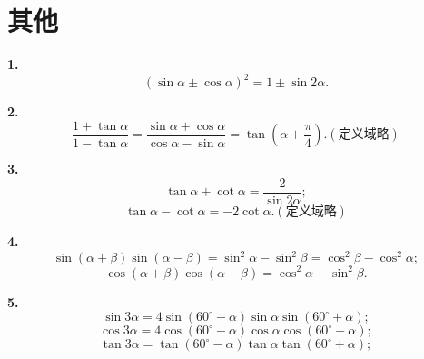 \documentclass{article}
\begin{document}
\section{{\large 其他}}
\textbf{1.}\[(\sin\alpha\pm\cos\alpha)^2=1\pm\sin2\alpha.\]
\par\textbf{2.}
\[\frac{1+\tan\alpha}{1-\tan\alpha}=\frac{\sin\alpha+\cos\alpha}{\cos\alpha-\sin\alpha}=\tan\left(\alpha+\frac{\pi}{4}\right).(\text{定义域略})\]
\par\textbf{3.}
\[\tan\alpha+\cot\alpha=\frac{2}{\sin2\alpha};\]
\[\tan\alpha-\cot\alpha=-2\cot\alpha.(\text{定义域略})\]
\par\textbf{4.}
\[\sin(\alpha+\beta)\sin(\alpha-\beta)=\sin^2\alpha-\sin^2\beta=\cos^2\beta-\cos^2\alpha;\]
\[\cos(\alpha+\beta)\cos(\alpha-\beta)=\cos^2\alpha-\sin^2\beta.\]
\par\textbf{5.}
\[\sin3\alpha=4\sin(60^\circ-\alpha)\sin\alpha\sin(60^\circ+\alpha);\]
\[\cos3\alpha=4\cos(60^\circ-\alpha)\cos\alpha\cos(60^\circ+\alpha);\]
\[\tan3\alpha=\tan(60^\circ-\alpha)\tan\alpha\tan(60^\circ+\alpha);\]
\newpage
\pagestyle{empty}
\quad
\newpage
\quad
\end{document}
